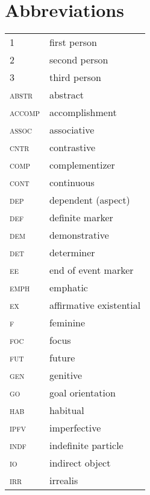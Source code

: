 \documentclass[output=paper,draft,draftmode,colorlinks,citecolor=brown]{langscibook}
\begin{document}

\section*{Abbreviations}
\begin{tabularx}{.45\textwidth}[t]{@{} l Q }
1				&first person\\
2 				&second person\\
3 				&third person\\
\textsc{abstr}	&abstract\\
\textsc{accomp}		&accomplishment\\
\textsc{assoc}		&associative\\
\textsc{cntr}		&contrastive\\
\textsc{comp}	&complementizer\\
\textsc{cont}		&continuous\\
\textsc{dep}		&dependent (aspect)\\
\textsc{def}		&definite marker\\
\textsc{dem}		&demonstrative\\
\textsc{det}		&determiner\\
\textsc{ee}		&end of event marker\\
\textsc{emph}	&emphatic\\
\textsc{ex}		&affirmative existential\\
\textsc{f} 		&feminine\\
\textsc{foc}		&focus\\
\textsc{fut} 		&future\\
\textsc{gen}		&genitive\\
\textsc{go}		&goal orientation\\
\textsc{hab}		&habitual\\
\textsc{ipfv}		&imperfective\\
\textsc{indf}	&indefinite particle\\
\textsc{io}		&indirect object\\
\textsc{irr}		&irrealis\\
\end{tabularx}
\end{document}
